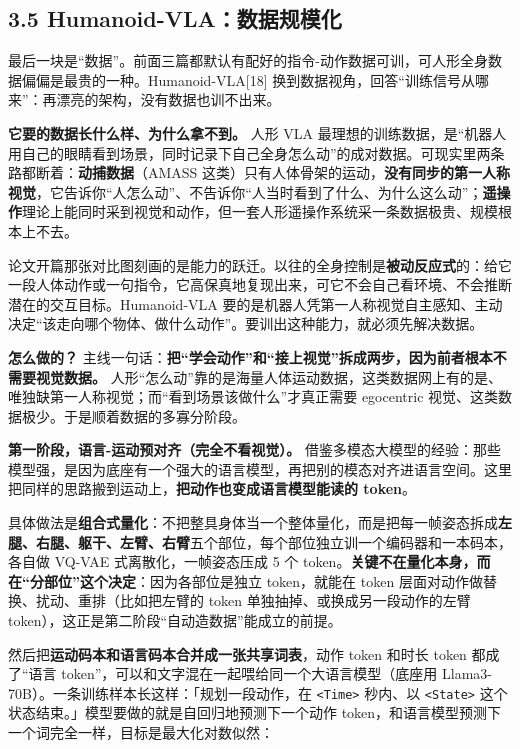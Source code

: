 \documentclass[
  chinese,
]{ctexart}
\begin{document}
\subsection{3.5
Humanoid-VLA：数据规模化}\label{humanoid-vlaux6570ux636eux89c4ux6a21ux5316}

最后一块是``数据''。前面三篇都默认有配好的指令-动作数据可训，可人形全身数据偏偏是最贵的一种。Humanoid-VLA{[}18{]}
换到数据视角，回答``训练信号从哪来''：再漂亮的架构，没有数据也训不出来。

\textbf{它要的数据长什么样、为什么拿不到。} 人形 VLA
最理想的训练数据，是``机器人用自己的眼睛看到场景，同时记录下自己全身怎么动''的成对数据。可现实里两条路都断着：\textbf{动捕数据}（AMASS
这类）只有人体骨架的运动，\textbf{没有同步的第一人称视觉}，它告诉你``人怎么动''、不告诉你``人当时看到了什么、为什么这么动''；\textbf{遥操作}理论上能同时采到视觉和动作，但一套人形遥操作系统采一条数据极贵、规模根本上不去。

论文开篇那张对比图刻画的是能力的跃迁。以往的全身控制是\textbf{被动反应式}的：给它一段人体动作或一句指令，它高保真地复现出来，可它不会自己看环境、不会推断潜在的交互目标。Humanoid-VLA
要的是机器人凭第一人称视觉自主感知、主动决定``该走向哪个物体、做什么动作''。要训出这种能力，就必须先解决数据。

\textbf{怎么做的？}
主线一句话：\textbf{把``学会动作''和``接上视觉''拆成两步，因为前者根本不需要视觉数据。}
人形``怎么动''靠的是海量人体运动数据，这类数据网上有的是、唯独缺第一人称视觉；而``看到场景该做什么''才真正需要
egocentric 视觉、这类数据极少。于是顺着数据的多寡分阶段。

\textbf{第一阶段，语言-运动预对齐（完全不看视觉）。}
借鉴多模态大模型的经验：那些模型强，是因为底座有一个强大的语言模型，再把别的模态对齐进语言空间。这里把同样的思路搬到运动上，\textbf{把动作也变成语言模型能读的
token}。

具体做法是\textbf{组合式量化}：不把整具身体当一个整体量化，而是把每一帧姿态拆成\textbf{左腿、右腿、躯干、左臂、右臂}五个部位，每个部位独立训一个编码器和一本码本，各自做
VQ-VAE 式离散化，一帧姿态压成 5 个
token。\textbf{关键不在量化本身，而在``分部位''这个决定}：因为各部位是独立
token，就能在 token 层面对动作做替换、扰动、重排（比如把左臂的 token
单独抽掉、或换成另一段动作的左臂
token），这正是第二阶段``自动造数据''能成立的前提。

然后把\textbf{运动码本和语言码本合并成一张共享词表}，动作 token 和时长
token 都成了``语言
token''，可以和文字混在一起喂给同一个大语言模型（底座用
Llama3-70B）。一条训练样本长这样：「规划一段动作，在
\texttt{\textless{}Time\textgreater{}} 秒内、以
\texttt{\textless{}State\textgreater{}}
这个状态结束。」模型要做的就是自回归地预测下一个动作
token，和语言模型预测下一个词完全一样，目标是最大化对数似然：
\end{document}
